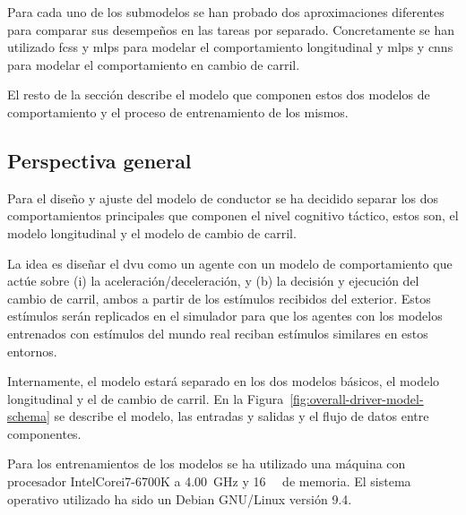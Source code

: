 Para cada uno de los submodelos se han probado dos aproximaciones diferentes para comparar sus desempeños en las tareas por separado. Concretamente se han utilizado \acp{fcs} y \acp{mlp} para modelar el comportamiento longitudinal y \acp{mlp} y \acp{cnn} para modelar el comportamiento en cambio de carril.

El resto de la sección describe el modelo que componen estos dos modelos de comportamiento y el proceso de entrenamiento de los mismos.

\subsection{Perspectiva general}

Para el diseño y ajuste del modelo de conductor se ha decidido separar los dos comportamientos principales que componen el nivel cognitivo táctico, estos son, el modelo longitudinal y el modelo de cambio de carril.

La idea es diseñar el \ac{dvu} como un agente con un modelo de comportamiento que actúe sobre (i) la aceleración/deceleración, y (b) la decisión y ejecución del cambio de carril, ambos a partir de los estímulos recibidos del exterior. Estos estímulos serán replicados en el simulador para que los agentes con los modelos entrenados con estímulos del mundo real reciban estímulos similares en estos entornos.

Internamente, el modelo estará separado en los dos modelos básicos, el modelo longitudinal y el de cambio de carril. En la Figura~\ref{fig:overall-driver-model-schema} se describe el modelo, las entradas y salidas y el flujo de datos entre componentes.

\begin{figure*}
	\centering
	\caption[Esquema general del modelo de conductor planteado]{Esquema general del modelo de conductor planteado en la tesis. En éste se puede ver cómo se distribuyen los estímulos de entrada entre los diferentes componentes del modelo y las salidas del sistema, que irán conectadas a los actuadores pertinentes.}
	\label{fig:overall-driver-model-schema}
\end{figure*}


Para los entrenamientos de los modelos se ha utilizado una máquina con procesador Intel\textregistered Core\texttrademark i7-6700K a \SI{4.00}{\giga\Hz} y \SI{16}{\gibi\byte} de memoria. El sistema operativo utilizado ha sido un Debian GNU/Linux versión 9.4.

